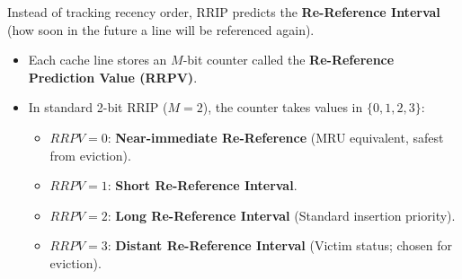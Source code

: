 \documentclass[11pt, a4paper]{article}
\begin{document}
\begin{defensebox}[title=\textbf{RRIP Fundamentals}]
Instead of tracking recency order, RRIP predicts the \textbf{Re-Reference Interval} (how soon in the future a line will be referenced again).
\begin{itemize}[leftmargin=1.2em]
  \item Each cache line stores an $M$-bit counter called the \textbf{Re-Reference Prediction Value (RRPV)}.
  \item In standard 2-bit RRIP ($M=2$), the counter takes values in $\{0, 1, 2, 3\}$:
  \begin{itemize}
    \item $RRPV = 0$: \textbf{Near-immediate Re-Reference} (MRU equivalent, safest from eviction).
    \item $RRPV = 1$: \textbf{Short Re-Reference Interval}.
    \item $RRPV = 2$: \textbf{Long Re-Reference Interval} (Standard insertion priority).
    \item $RRPV = 3$: \textbf{Distant Re-Reference Interval} (Victim status; chosen for eviction).
  \end{itemize}
\end{itemize}
\end{defensebox}
\end{document}
